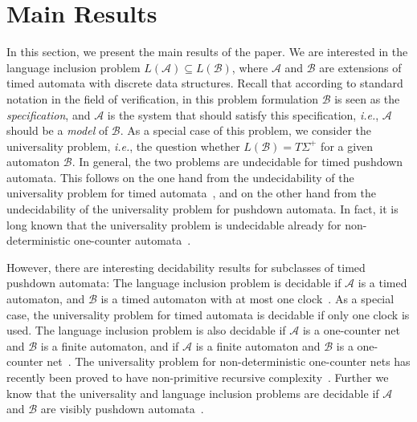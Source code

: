 \documentclass{CSML}
\theoremstyle{plain}\newtheorem{theorem}[thm]{Theorem}
\theoremstyle{plain}\newtheorem{corollary}[thm]{Corollary}
\theoremstyle{plain}\newtheorem{example}[thm]{Example}
\theoremstyle{plain}\newtheorem{lemma}[thm]{Lemma}
\theoremstyle{plain}\newtheorem{remark}[thm]{Remark}
\newcommand{\B}{\mathcal{B}}
\newcommand*\ie{\textit{i.e.}}
\newcommand{\A}{\mathcal{A}}
\begin{document}
\section{Main Results}
In this section,
we present the main results of the paper.
We are interested in the language inclusion problem $L(\A)\subseteq L(\B)$, where
$\A$ and $\B$ are extensions of timed automata with discrete data structures.
Recall that according to standard notation in the field of verification, in this problem formulation 
$\B$ is seen as the \emph{specification}, and $\A$ is the system that should satisfy this specification, \ie, $\A$ should be a \emph{model} of $\B$.  
	As a special case of this problem, we consider the universality problem, \ie, the question whether $L(\B)=T\Sigma^+$ for a given automaton $\B$.	
	In general, the two problems are undecidable  for timed pushdown automata. 
	This follows on the one hand  from the undecidability of the universality problem for timed automata~\cite{AD94}, 
	and on the other hand from the undecidability of the universality problem for pushdown automata. In fact, it is long known that the universality problem is  undecidable already for non-deterministic one-counter automata~\cite{DBLP:journals/jacm/Greibach69,DBLP:journals/mst/Ibarra79}.
	
		
	However, there are interesting decidability results for subclasses of timed pushdown automata:
	The language inclusion problem is decidable if $\A$ is a timed automaton, and $\B$ is a timed automaton with at most one clock~\cite{DBLP:conf/lics/OuaknineW04}. As a special case, the universality problem for timed automata is decidable if only one clock is used. 
	The language inclusion problem is also decidable if
	$\A$ is a one-counter net and $\B$ is a finite automaton, 
	and if $\A$ is a finite automaton and $\B$ is a one-counter net~\cite{DBLP:journals/jcss/JanarEM99}.
	The universality problem for non-deterministic one-counter nets has recently been proved to have non-primitive recursive complexity~\cite{DBLP:conf/rp/HofmanT14}.
Further we know that the universality and language inclusion problems are decidable if $\A$ and $\B$ are visibly pushdown automata~\cite{DBLP:conf/stoc/AlurM04}.
	
\end{document}
